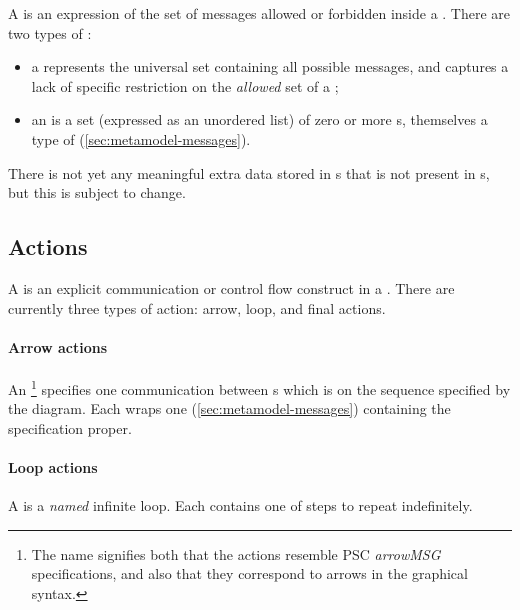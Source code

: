 A \mgapmessageset{} is an expression of the set of messages allowed or forbidden
inside a \msequencegap.  There are two types of \mgapmessageset:

\begin{itemize}
\item
	a \muniversegapmessageset{} represents the universal set containing 
	all possible messages, and
	captures a lack of specific restriction on
	the \emph{allowed} set of a \msequencegap;
\item	
	an \mextensionalgapmessageset{} is a set (expressed as an unordered list) of
	zero or more \mgapmessagespec s, themselves
	a type of \mmessagespec{} (\cref{sec:metamodel-messages}).
\end{itemize}

There is not yet any meaningful extra data stored in
\mgapmessagespec s that is not present in \mmessagespec s, but this is subject
to change.


\subsection{Actions}\label{sec:metamodel-sequences-actions}

A \msequenceaction{} is an explicit communication or control flow construct in a
\msubsequence.  There are currently three types of action: arrow, loop, and
final actions.

\paragraph{Arrow actions}

An \marrowaction\footnote{The name signifies both that the actions resemble
PSC \emph{arrowMSG} specifications, and also that they correspond to arrows in
the graphical syntax.} specifies one communication between \mactor s which is on
the sequence specified by the diagram.  Each \marrowaction{} wraps one
\marrowmessagespec{} (\cref{sec:metamodel-messages})
containing the specification proper.

\paragraph{Loop actions}

A \mloopaction{} is a \emph{named} infinite loop.    Each \mloopaction{} contains one
\msubsequence{} of steps to repeat indefinitely.

